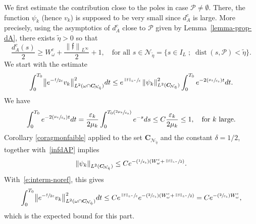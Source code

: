\documentclass[10pt]{amsart}
\newcommand{\Psfrac}[2]{(\sfrac{#1}{#2})}
\newcommand{\sep}{\;;\;}
\theoremstyle{definition}
\newcommand{\calN}{\ensuremath{\mathcal N}}
\newcommand{\f}{\ensuremath{\mathfrak{f}}}
\DeclareMathOperator{\dist}{dist}
\newcommand\nor[2]{\left\|#1\right\|_{#2}}
\newcommand\bnor[2]{\bigl\|#1\bigr\|_{#2}}
\newcommand{\ce}{c}
\let\e\varepsilon
\let\eps\varepsilon
\newcommand\CO[1]{\boldsymbol{C}_{\!#1}}
\begin{document}
We first estimate the contribution close to the poles in case $\mathcal{P}\neq \emptyset$. There, the function $\psi_k$ (hence $v_k$) is supposed to be very small since $d_A^{\ce}$ is large. More precisely, using the asymptotics of $d_A^{\ce}$ close to $\mathcal{P}$ given by Lemma~\ref{lemma-prop-dA}, there exists $\widetilde{\eta}>0$ so that%
\begin{equation}
\label{infdAP}
\frac{d_A^{\ce}(s)}{2}\geq W^{\ce}_{\omega}+\frac{\nor{\f}{L^{\infty}}}{2} +1,\quad \text{for all } s\in \calN_{\tilde{\eta}}=\{ s\in I_L \sep \dist(s,\mathcal{P}) < \widetilde{\eta}\}.
\end{equation}
We start with the estimate
\begin{equation}
\label{e:interm-noref}
\int_0^{T_0}\bnor{e^{-\sfrac{\f}{2\eps}}v_{k} }{L^2(\omega\cap\CO{\calN_{\tilde{\eta}}})}^2 dt\leq e^{\sfrac{\nor{\f}{L^{\infty}}}{\eps}} \nor{\psi_k }{L^2(\CO{\calN_{\tilde{\eta}}})}^2\int_0^{T_0}e^{-2\Psfrac{\mu_k}{\e_{k}} t} dt.
\end{equation}
We have
\[
\int_0^{T_0}e^{-2\Psfrac{\mu_k}{\e_{k}} t} dt=\frac{\e_{k}}{2\mu_k}\int_0^{ T_0\Psfrac{2\mu_k}{\e_{k}}}e^{- s} ds\leq C\frac{\e_{k}}{2\mu_k}\leq 1,\quad\text{for $k$ large.}
\]
Corollary \ref{coragmonfaible} applied to the set $\CO{\calN_{\tilde{\eta}}}$ and the constant $\delta=1/2$, together with~\eqref{infdAP} implies
\[
\nor{\psi_k }{L^2(\CO{\calN_{\tilde{\eta}}})}\leq C e^{-\Psfrac{1}{\e_k} (W^{\ce}_{\omega} +\sfrac{\nor{\f}{L^{\infty}}}{2})}.
\]
With~\eqref{e:interm-noref}, this gives
\[
\int_0^{T_0}\bnor{e^{-\sfrac{\f}{2\eps}}v_{k} }{L^2(\omega\cap \CO{\calN_{\tilde{\eta}}})}^2 dt
\leq C e^{\sfrac{\nor{\f}{L^{\infty}}}{\eps}}e^{-\Psfrac{2}{\e_k} (W^{\ce}_{\omega} +\sfrac{\nor{\f}{L^{\infty}}}{2})} = Ce^{-\Psfrac{2}{\e_k} W^{\ce}_{\omega}},
\]
which is the expected bound for this part.
\end{document}
